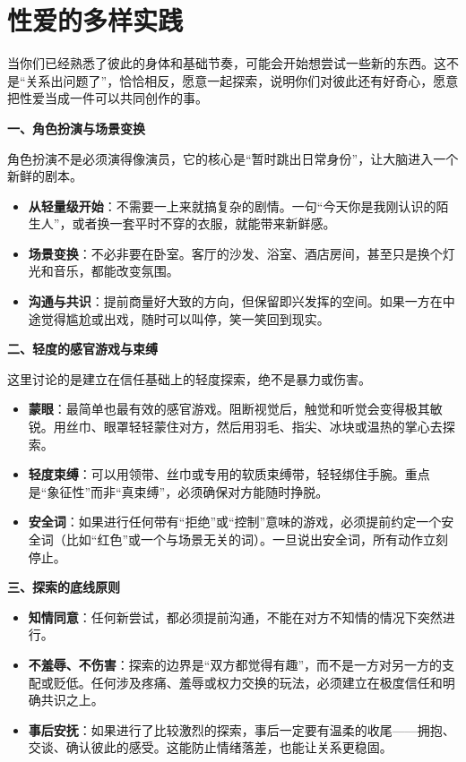 \documentclass[12pt,UTF8]{ctexbook}
\begin{document}
\section{性爱的多样实践}

当你们已经熟悉了彼此的身体和基础节奏，可能会开始想尝试一些新的东西。这不是“关系出问题了”，恰恰相反，愿意一起探索，说明你们对彼此还有好奇心，愿意把性爱当成一件可以共同创作的事。

\textbf{一、角色扮演与场景变换}

角色扮演不是必须演得像演员，它的核心是“暂时跳出日常身份”，让大脑进入一个新鲜的剧本。

\begin{itemize}
\item \textbf{从轻量级开始}：不需要一上来就搞复杂的剧情。一句“今天你是我刚认识的陌生人”，或者换一套平时不穿的衣服，就能带来新鲜感。
\item \textbf{场景变换}：不必非要在卧室。客厅的沙发、浴室、酒店房间，甚至只是换个灯光和音乐，都能改变氛围。
\item \textbf{沟通与共识}：提前商量好大致的方向，但保留即兴发挥的空间。如果一方在中途觉得尴尬或出戏，随时可以叫停，笑一笑回到现实。
\end{itemize}

\textbf{二、轻度的感官游戏与束缚}

这里讨论的是建立在信任基础上的轻度探索，绝不是暴力或伤害。

\begin{itemize}
\item \textbf{蒙眼}：最简单也最有效的感官游戏。阻断视觉后，触觉和听觉会变得极其敏锐。用丝巾、眼罩轻轻蒙住对方，然后用羽毛、指尖、冰块或温热的掌心去探索。
\item \textbf{轻度束缚}：可以用领带、丝巾或专用的软质束缚带，轻轻绑住手腕。重点是“象征性”而非“真束缚”，必须确保对方能随时挣脱。
\item \textbf{安全词}：如果进行任何带有“拒绝”或“控制”意味的游戏，必须提前约定一个安全词（比如“红色”或一个与场景无关的词）。一旦说出安全词，所有动作立刻停止。
\end{itemize}

\textbf{三、探索的底线原则}

\begin{itemize}
\item \textbf{知情同意}：任何新尝试，都必须提前沟通，不能在对方不知情的情况下突然进行。
\item \textbf{不羞辱、不伤害}：探索的边界是“双方都觉得有趣”，而不是一方对另一方的支配或贬低。任何涉及疼痛、羞辱或权力交换的玩法，必须建立在极度信任和明确共识之上。
\item \textbf{事后安抚}：如果进行了比较激烈的探索，事后一定要有温柔的收尾——拥抱、交谈、确认彼此的感受。这能防止情绪落差，也能让关系更稳固。
\end{itemize}
\end{document}
